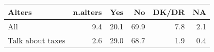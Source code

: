 \begin{table}[ht]
\centering
\begin{tabular}{lrrrrr}
  \hline
Alters & n.alters & Yes & No & DK/DR & NA \\ 
  \hline
All & 9.4 & 20.1 & 69.9 & 7.8 & 2.1 \\ 
  Talk about taxes & 2.6 & 29.0 & 68.7 & 1.9 & 0.4 \\ 
   \hline
\end{tabular}
\end{table}
